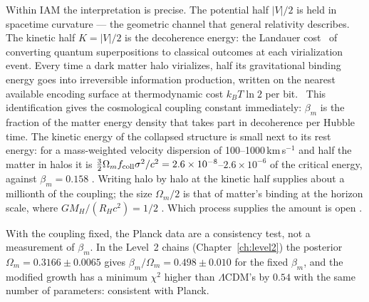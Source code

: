 Within IAM the interpretation is precise. The potential half $|V|/2$ is held in spacetime curvature --- the geometric channel that general relativity
describes. The kinetic half $K=|V|/2$ is the decoherence energy: the Landauer cost~\cite{Landauer1961} of converting quantum superpositions to classical outcomes at each
virialization event. Every time a dark matter halo virializes, half its gravitational binding energy goes into irreversible information production, written
on the nearest available encoding surface at thermodynamic cost $k_BT\ln2$ per bit. \interp\ This identification gives the cosmological coupling constant
immediately: $\beta_m$ is the fraction of the matter energy density that takes part in decoherence per Hubble time. The kinetic energy of the collapsed structure is small next to its rest energy: for a mass-weighted velocity dispersion of 100--1000\,km\,s$^{-1}$ and half the matter in halos it is $\tfrac32\Omega_m f_{\rm coll}\sigma^2/c^2=2.6\times10^{-8}$--$2.6\times10^{-6}$ of the critical energy, against $\beta_m=0.158$ \calc. Writing halo by halo at the kinetic half supplies about a millionth of the coupling; the size $\Omega_m/2$ is that of matter's binding at the horizon scale, where $GM_H/(R_Hc^2)=1/2$ \derived. Which process supplies the amount is open \openprob.

With the coupling fixed, the Planck data are a consistency test, not a measurement of $\beta_m$. In the Level~2 chains (Chapter~\ref{ch:level2}) the
posterior $\Omega_m=0.3166\pm0.0065$ gives $\beta_m/\Omega_m=0.498\pm0.010$ for the fixed $\beta_m$, and the modified growth has a minimum $\chi^2$ higher
than $\Lambda$CDM's by $0.54$ with the same number of parameters: consistent with Planck. \measured

